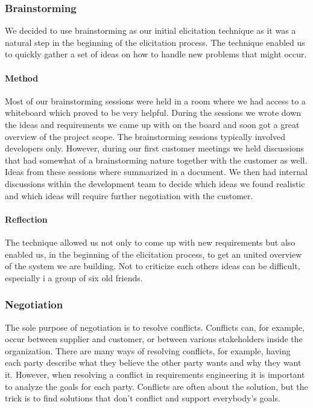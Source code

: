 \documentclass[10pt]{article}
\begin{document}
\subsubsection{Brainstorming}
We decided to use brainstorming as our initial elicitation technique as it was a natural step in the beginning of the elicitation process. The technique enabled us to quickly gather a set of ideas on how to handle new problems that might occur.

\paragraph{Method}
\hfill \break
Most of our brainstorming sessions were held in a room where we had access to a whiteboard which proved to be very helpful. During the sessions we wrote down the ideas and requirements we came up with on the board and soon got a great overview of the project scope. The brainstorming sessions typically involved developers only. However, during our first customer meetings we held discussions that had somewhat of a brainstorming nature together with the customer as well. Ideas from these sessions where summarized in a document. We then had internal discussions within the development team to decide which ideas we found realistic and which ideas will require further negotiation with the customer.
\paragraph{Reflection}
\hfill \break
The technique allowed us not only to come up with new requirements but also enabled us, in the beginning of the elicitation process, to get an united overview of the system we are building. Not to criticize each others ideas can be difficult, especially i a group of six old friends.

\subsubsection{Negotiation}
The sole purpose of negotiation is to resolve conflicts. Conflicts can, for example, occur between supplier and customer, or between various stakeholders inside the organization. There are many ways of resolving conflicts, for example, having each party describe what they believe the other party wants and why they want it. However, when resolving a conflict in requirements engineering it is important to analyze the goals for each party. Conflicts are often about the solution, but the trick is to find solutions that don’t conflict and support everybody’s goals.
\end{document}

